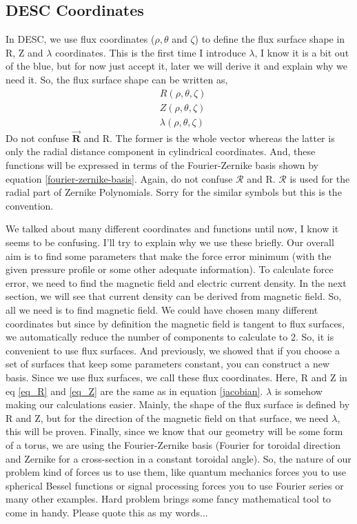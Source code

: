 \subsection{DESC Coordinates}

In DESC, we use flux coordinates ($\rho, \theta$ and $\zeta$) to define the flux surface shape in R, Z and $\lambda$ coordinates. This is the first time I introduce $\lambda$, I know it is a bit out of the blue, but for now just accept it, later we will derive it and explain why we need it. So, the flux surface shape can be written as,
\begin{align}
    &R(\rho, \theta, \zeta)  \label{eq_R}\\
    &Z(\rho, \theta, \zeta) \label{eq_Z}\\
    &\lambda(\rho, \theta, \zeta)
\end{align}
{\color{red}Do not confuse $\Vec{\mathbf{R}}$ and R.} The former is the whole vector whereas the latter is only the radial distance component in cylindrical coordinates. And, these functions will be expressed in terms of the Fourier-Zernike basis shown by equation \ref{fourier-zernike-basis}. {\color{red}Again, do not confuse $\mathcal{R}$ and R.} $\mathcal{R}$ is used for the radial part of Zernike Polynomials. Sorry for the similar symbols but this is the convention. 

We talked about many different coordinates and functions until now, I know it seems to be confusing. I'll try to explain why we use these briefly. Our overall aim is to find some parameters that make the force error minimum (with the given pressure profile or some other adequate information). To calculate force error, we need to find the magnetic field and electric current density. In the next section, we will see that current density can be derived from magnetic field. So, all we need is to find magnetic field. We could have chosen many different coordinates but since by definition the magnetic field is tangent to flux surfaces, we automatically reduce the number of components to calculate to 2. So, it is convenient to use flux surfaces. And previously, we showed that if you choose a set of surfaces that keep some parameters constant, you can construct a new basis. Since we use flux surfaces, we call these flux coordinates. Here, R and Z in eq \ref{eq_R} and \ref{eq_Z} are the same as in equation \ref{jacobian}. $\lambda$ is somehow making our calculations easier. Mainly, the shape of the flux surface is defined by R and Z, but for the direction of the magnetic field on that surface, we need $\lambda$, this will be proven. Finally, since we know that our geometry will be some form of a torus, we are using the Fourier-Zernike basis (Fourier for toroidal direction and Zernike for a cross-section in a constant toroidal angle). So, the nature of our problem kind of forces us to use them, like quantum mechanics forces you to use spherical Bessel functions or signal processing forces you to use Fourier series or many other examples. Hard problem brings some fancy mathematical tool to come in handy. Please quote this as my words...

